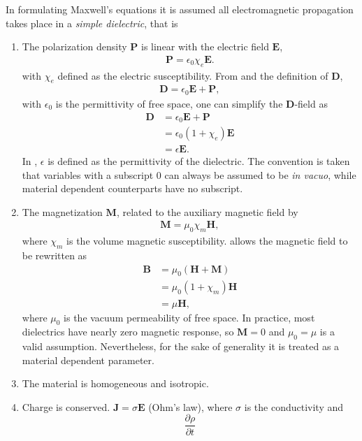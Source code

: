 In formulating Maxwell's equations it is assumed all electromagnetic
propagation takes place in a {\it simple dielectric}, that is
\begin{enumerate}
\item The polarization density $\mathbf{P}$ is linear with the electric
field $\mathbf{E}$,
\begin{align}
\mathbf{P}=\epsilon_0\chi_e\mathbf{E}.
\label{eqn:pdensity}
\end{align}
with $\chi_e$ defined as the electric susceptibility.  From
 and the definition
of $\mathbf{D}$,
\begin{align}
\mathbf{D}=\epsilon_0\mathbf{E}+\mathbf{P},
\label{eqn:dfield}
\end{align}
with $\epsilon_0$ is the permittivity of free space, one can simplify the
$\mathbf{D}$-field as 
\begin{align}
\mathbf{D}&=\epsilon_0\mathbf{E}+\mathbf{P}\\
&=\epsilon_0(1+\chi_e)\mathbf{E}\\
&=\epsilon\mathbf{E}.
\label{eqn:permittivitydangle}
\end{align}
In , $\epsilon$ is defined as the
permittivity of the dielectric.  The convention is taken 
that variables with a subscript $0$ can always be assumed to be 
{\it in vacuo}, while material dependent counterparts have
no subscript.  
\item The magnetization $\mathbf{M}$, related to the
auxiliary magnetic field by 
\begin{align}
\mathbf{M}=\mu_0\chi_m\mathbf{H},
\label{eqn:auxfield}
\end{align}
where $\chi_m$ is the volume magnetic susceptibility.
 allows the
magnetic field to be rewritten as
\begin{align}
\mathbf{B}&=\mu_0\left(\mathbf{H}+\mathbf{M}\right)\\
&=\mu_0\left(1+\chi_m\right)\mathbf{H}\\
&=\mu \mathbf{H},
\end{align}
where $\mu_0$ is the vacuum permeability of free space.  In practice, most
dielectrics have nearly zero magnetic response, so $\mathbf{M}=0$ and
$\mu_0=\mu$ is a valid assumption.  Nevertheless, for the sake of generality it is treated as a
material dependent parameter.
\item The material is homogeneous and isotropic.
\item Charge is conserved.  $\mathbf{J} = \sigma \mathbf{E}$ (Ohm's law), where
 $\sigma$ is the conductivity and
\begin{equation}
 \frac{\partial \rho}{\partial t} 
\end{equation}
\end{enumerate}
